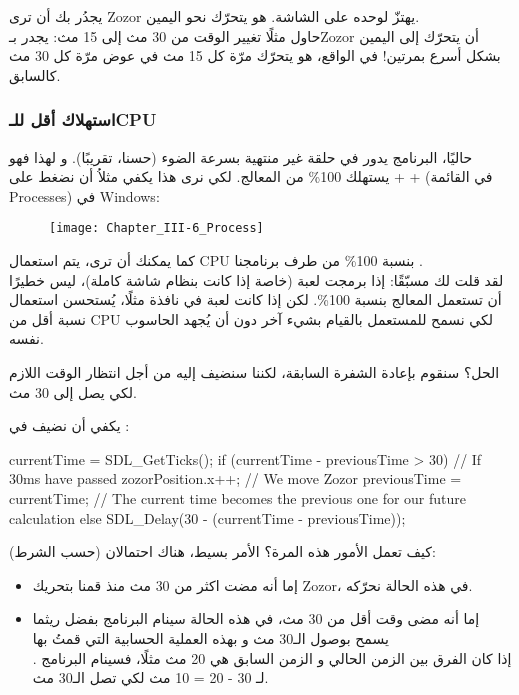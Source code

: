 يجدُر بك أن ترى
\textenglish{Zozor}
يهتزّ لوحده على الشاشة. هو يتحرّك نحو اليمين. \\
حاول مثلًا تغيير الوقت من 30 مث إلى 15 مث: يجدر بـ\textenglish{Zozor}
أن يتحرّك إلى اليمين بشكل أسرع بمرتين! في الواقع، هو يتحرّك مرّة كل 15 مث في عوض مرّة كل 30 مث كالسابق.

\subsubsection{استهلاك أقل للـ\textenglish{CPU}}

حاليًا، البرنامج يدور في حلقة غير منتهية بسرعة الضوء (حسنا، تقريبًا). و لهذا فهو يستهلك 100\% من المعالج. لكي نرى هذا يكفي مثلاُ أن نضغط على 
 +  + 
(في القائمة
\textenglish{Processes})
في
\textenglish{Windows}:

\begin{figure}[H]
	\centering
	\texttt{[image: Chapter\_III-6\_Process]}
\end{figure}

كما يمكنك أن ترى، يتم استعمال
\textenglish{CPU}
بنسبة 100\% من طرف برنامجنا
.\\
لقد قلت لك مسبّقًا: إذا برمجت لعبة (خاصة إذا كانت بنظام شاشة كاملة)، ليس خطيرًا أن تستعمل المعالج بنسبة 100\%. لكن إذا كانت لعبة في نافذة مثلًا، يُستحسن استعمال نسبة أقل من
\textenglish{CPU}
لكي نسمح للمستعمل بالقيام بشيء آخر دون أن يُجهد الحاسوب نفسه.

الحل؟ سنقوم بإعادة الشفرة السابقة، لكننا سنضيف إليه
من أجل انتظار الوقت اللازم لكي يصل إلى 30 مث.

يكفي أن نضيف
في 
:

\begin{Csource}
currentTime = SDL_GetTicks();
if (currentTime - previousTime > 30) // If 30ms have passed
{
	zozorPosition.x++; // We move Zozor
	previousTime = currentTime; // The current time becomes the previous one for our future calculation
}
else
{
	SDL_Delay(30 - (currentTime - previousTime));
}
\end{Csource}

كيف تعمل الأمور هذه المرة؟ الأمر بسيط، هناك احتمالان (حسب الشرط):

\begin{itemize}
	\item إما أنه مضت اكثر من 30 مث منذ قمنا بتحريك
	\textenglish{Zozor}،
	في هذه الحالة نحرّكه.
	\item إما أنه مضى وقت أقل من 30 مث، في هذه الحالة سينام البرنامج بفضل
	ريثما يسمح بوصول الـ30 مث و بهذه العملية الحسابية التي قمتُ بها\\
	.
	إذا كان الفرق بين الزمن الحالي و الزمن السابق هي 20 مث مثلًا، فسينام البرنامج لـ
	30 - 20 = 10
	مث لكي تصل الـ30 مث.
\end{itemize}


